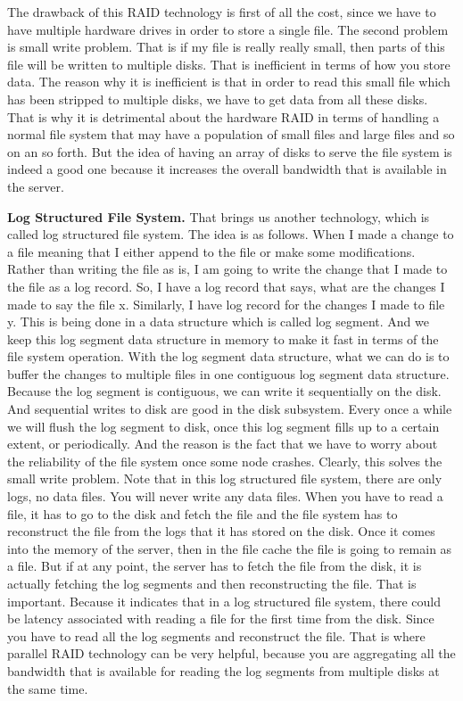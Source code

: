 \documentclass[11pt]{lecture}
\begin{document}
The drawback of this RAID technology is first of all the cost, since we have to have multiple hardware 
drives in order to store a single file. The second problem is small write problem. That is if my file is 
really really small, then parts of this file will be written to multiple disks. That is inefficient in terms of 
how you store data. The reason why it is inefficient is that in order to read this small file which 
has been stripped to multiple disks, we have to get data from all these disks. That is why it is detrimental about 
the hardware RAID in terms of handling a normal file system that may have a population of small files and 
large files and so on an so forth. But the idea of having an array of disks to serve the file 
system is indeed a good one because it increases the overall bandwidth that is available in the server. 

\noindent
{\bf Log Structured File System.} That brings us another technology, which is called log structured 
file system. The idea is as follows. When I made a change to a file meaning that I either append to 
the file or make some modifications. Rather than writing the file as is, I am going to write the 
change that I made to the file as a log record. So, I have a log record that says, what are the changes I made 
to say the file {\code x}. Similarly, I have log record for the changes I made to file {\code y}. This is 
being done in a data structure which is called log segment. And we keep this log segment data structure 
in memory to make it fast in terms of the file system operation. With the log segment data structure, 
what we can do is to buffer the changes to multiple files in one contiguous log segment data structure. 
Because the log segment is contiguous, we can write it sequentially on the disk. And sequential writes 
to disk are good in the disk subsystem. Every once a while we will flush the log segment to disk, 
once this log segment fills up to a certain extent, or periodically. And the reason is the fact that 
we have to worry about the reliability of the file system once some node crashes. Clearly, this solves the 
small write problem. Note that in this log structured file system, there are only logs, no data files. 
You will never write any data files. When you have to read a file, it has to go to the disk and 
fetch the file and the file system has to reconstruct the file from the logs that it has stored on 
the disk. Once it comes into the memory of the server, then in the file cache the file is going to remain as 
a file. But if at any point, the server has to fetch the file from the disk, it is actually fetching the 
log segments and then reconstructing the file. That is important. Because it indicates that in a 
log structured file system, there could be latency associated with reading a file for the first 
time from the disk. Since you have to read all the log segments and reconstruct the file. That is 
where parallel RAID technology can be very helpful, because you are aggregating all the bandwidth that 
is available for reading the log segments from multiple disks at the same time. 
\end{document}
